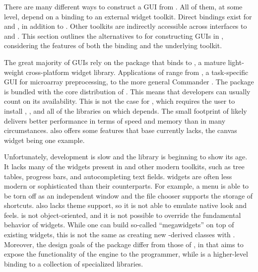 \documentclass[article,shortnames]{jss}
\begin{document}
There are many different ways to construct a GUI from .
All of them,
at some level, depend on a binding to an external widget toolkit.
Direct bindings
exist for  \citep{ousterhout,welch} and 
\citep{wxwidgets}, 
in addition to . Other toolkits are indirectly accessible
across 
interfaces to  \citep{DCOM} and 
\citep{Java}. 
This section outlines the alternatives to  for
constructing GUIs in , considering the features of both
the
 binding and the underlying toolkit.

The great majority of  GUIs rely on the 
package 
\citep{Rnews:Dalgaard:2001a, Rnews:Dalgaard:2002} that binds 
 to  \citep{ousterhout,welch}, a mature
light-weight cross-platform
widget library. Applications of  range from  
\citep{limma}, a task-specific GUI for microarray preprocessing, to
the more 
general  Commander \citep{rcmndr}. The  package 
is bundled with the core distribution of 
. This means that developers can usually count on its
availability.
This is not the case for , which requires the user
to install , , and all of the libraries on which
depends. The small footprint of  likely delivers better
performance in
terms of speed and memory than  in many circumstances.
also offers some features that base  currently lacks, the
canvas widget
being one example.

Unfortunately,  development is slow and the library is
beginning to show its age. It lacks many of the widgets present in
 and other modern toolkits, such as tree tables, progress
bars, and autocompleting text fields.  widgets are often
less modern or sophisticated than their  counterparts. For
example, a  menu is able to be torn off as an independent
window and the  file chooser supports the storage of
shortcuts.  also lacks theme support, so it is not able to
emulate native look and feels.   is
not object-oriented, and it is not possible to override the
fundamental behavior of widgets.  While one can build so-called
``megawidgets'' on top of existing  widgets, this is not the
same as creating new -derived classes with
. Moreover, the design goals of the  package
differ from those of , in that  aims to expose
the functionality of the  engine to the 
programmer, while  is a higher-level binding to a
collection of specialized  libraries.
\end{document}

